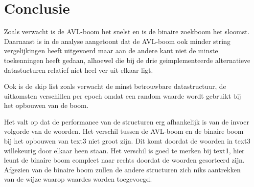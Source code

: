\chapter{Conclusie}
\label{sec:Hoofdstuk 8}

Zoals verwacht is de AVL-boom het snelst en is de binaire zoekboom het sloomst. Daarnaast is in de analyse aangetoont dat de AVL-boom ook minder string vergelijkingen heeft uitgevoerd maar aan de andere kant niet de minste toekenningen heeft gedaan, alhoewel die bij de drie geimplementeerde alternatieve datastucturen relatief niet heel ver uit elkaar ligt.

Ook is de skip list zoals verwacht de minst betrouwbare datastructuur, de uitkomsten verschillen per epoch omdat een random waarde wordt gebruikt bij het opbouwen van de boom.

Het valt op dat de performance van de structuren erg afhankelijk is van de invoer volgorde van de woorden. Het verschil tussen de AVL-boom en de binaire boom bij het opbouwen van text3 niet groot zijn. Dit komt doordat de woorden in text3 willekeurig door elkaar heen staan. Het verschil is goed te merken bij text1, hier leunt de binaire boom compleet naar rechts doordat de woorden gesorteerd zijn. Afgezien van de binaire boom zullen de andere structuren zich niks aantrekken van de wijze waarop waardes worden toegevoegd.

